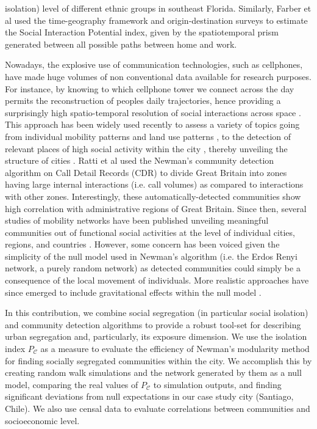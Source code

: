 \documentclass[%
preprint,
 amsmath,amssymb,
pra,
]{revtex4-1}
\begin{document}
isolation) level of different ethnic groups in southeast Florida. Similarly, Farber et al \cite{farber2015measuring} used the time-geography framework and origin-destination surveys to estimate the Social Interaction Potential index, given by the spatiotemporal prism generated between all possible paths between home and work. 

Nowadays, the explosive use of communication technologies, such as cellphones, have made huge volumes of non conventional data available for research purposes. For instance, by knowing to which cellphone tower we connect across the day permits the reconstruction of peoples daily  trajectories, hence providing a surprisingly high spatio-temporal resolution of social interactions across space \cite{panigutti2017assessing} . This approach has been widely used recently to assess a variety of topics going from individual mobility patterns \cite{gonzalez2008understanding} and land use patterns \cite{lenormand2015comparing}, to the detection of relevant places of high social activity within the city \cite{grauwin2015towards}, thereby unveiling the structure of cities \cite{louail2014mobile,Lenormand2015f}. Ratti et al \cite{ratti2010redrawing} used the Newman's community detection algorithm \cite{newman2006modularity} on Call Detail Records (CDR) to divide Great Britain into zones having large internal interactions (i.e. call volumes) as compared to interactions with other zones. Interestingly, these automatically-detected communities show high correlation with administrative regions of Great Britain. Since then, several studies of mobility networks have been published unveiling meaningful communities out of functional social activities at the level of individual cities, regions, and countries \cite{gao2017uncovering,sobolevsky2013delineating,zhong2013identifying}. However, some concern has been voiced given the simplicity of the null model used in Newman's algorithm (i.e. the Erdos Renyi network, a purely random network) as detected communities could simply be a consequence of the local movement of individuals. More realistic approaches have since emerged to include gravitational effects within the null model \cite{sarzynska2015null,expert2011uncovering}.\par 

In this contribution, we combine social segregation (in particular social isolation) and community detection algorithms to provide a robust tool-set for describing urban segregation and, particularly, its exposure dimension. We use the isolation index $P_\mathscr C$ \cite{massey1988dimensions} as a measure to evaluate the efficiency of Newman's modularity method for finding socially segregated communities within the city. We accomplish this by creating random walk simulations and the network generated by them as a null model, comparing the real values of $P_\mathscr C$ to simulation outputs, and finding significant deviations from null expectations in our case study city (Santiago, Chile). We also use censal data to evaluate correlations between communities and socioeconomic level. 
\end{document}
